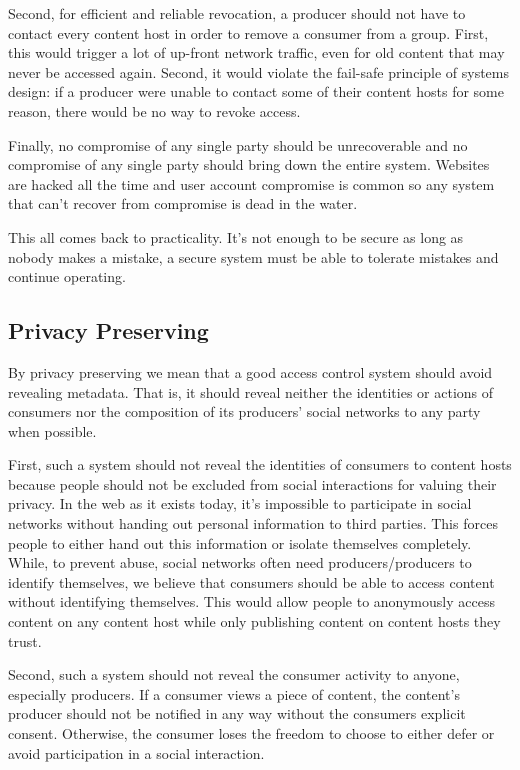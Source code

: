 \documentclass[pdftex,12pt,a4papaer,twoside,notitlepage]{report}
\begin{document}
Second, for efficient and reliable revocation, a producer should not have to
contact every content host in order to remove a consumer from a group. First,
this would trigger a lot of up-front network traffic, even for old content that
may never be accessed again. Second, it would violate the fail-safe principle of
systems design: if a producer were unable to contact some of their content hosts
for some reason, there would be no way to revoke access.

Finally, no compromise of any single party should be unrecoverable and no
compromise of any single party should bring down the entire system. Websites are
hacked all the time and user account compromise is common so any system that
can't recover from compromise is dead in the water.

This all comes back to practicality. It's not enough to be secure as long as
nobody makes a mistake, a secure system must be able to tolerate mistakes and
continue operating.

\subsection{Privacy Preserving}

By privacy preserving we mean that a good access control system should avoid
revealing metadata. That is, it should reveal neither the identities or actions
of consumers nor the composition of its producers' social networks to any party
when possible.

First, such a system should not reveal the identities of consumers to content
hosts because people should not be excluded from social interactions for valuing
their privacy. In the web as it exists today, it's impossible to participate in
social networks without handing out personal information to third parties. This
forces people to either hand out this information or isolate themselves
completely. While, to prevent abuse, social networks often need
producers/producers to identify themselves, we believe that consumers should
be able to access content without identifying themselves. This would allow
people to anonymously access content on any content host while only publishing
content on content hosts they trust.

Second, such a system should not reveal the consumer activity to anyone,
especially producers. If a consumer views a piece of content, the content's
producer should not be notified in any way without the consumers explicit
consent. Otherwise, the consumer loses the freedom to choose to either defer or
avoid participation in a social interaction.
\end{document}
